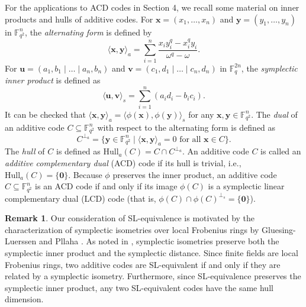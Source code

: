 \documentclass[a4paper,12pt]{article}
\theoremstyle{plain}
\theoremstyle{definition}
\newtheorem{remark}{Remark}
\begin{document}
For the applications to ACD codes in Section 4, we recall some material on inner products and hulls of additive codes. 
For $\mathbf{x} = (x_1, \dots, x_n)$ and $\mathbf{y} = (y_1, \dots, y_n)$ in $\mathbb{F}_{q^2}^n$, the \textit{alternating form} is defined by
\begin{equation*}
\langle \mathbf{x}, \mathbf{y} \rangle_a = \sum_{i=1}^n \frac{x_i y_i^q - x_i^q y_i}{\omega^q - \omega}.
\end{equation*}
For $\mathbf{u} = (a_1, b_1 \mid \dots \mid a_n, b_n)$ and $\mathbf{v} = (c_1, d_1 \mid \dots \mid c_n, d_n)$ in $\mathbb{F}_q^{2n}$, the \textit{symplectic inner product} is defined as
\begin{equation*}
\langle \mathbf{u}, \mathbf{v} \rangle_s = \sum_{i=1}^n (a_i d_i - b_i c_i).
\end{equation*}
It can be checked that $\langle \mathbf{x}, \mathbf{y} \rangle_a = \langle \phi(\mathbf{x}), \phi(\mathbf{y}) \rangle_s$ for any $\mathbf{x}, \mathbf{y} \in \mathbb{F}_{q^2}^n$. 
The \textit{dual} of an additive code $C \subseteq \mathbb{F}_{q^2}^n$ with respect to the alternating form is defined as
\begin{equation*}
C^{\perp_a} = \{ \mathbf{y} \in \mathbb{F}_{q^2}^n \mid \langle \mathbf{x}, \mathbf{y} \rangle_a = 0 \text{ for all } \mathbf{x} \in C \}.
\end{equation*}
The \textit{hull} of $C$ is defined as $\mathrm{Hull}_a(C) = C \cap C^{\perp_a}$. An additive code $C$ is called an \textit{additive complementary dual} (ACD) code if its hull is trivial, i.e., $\mathrm{Hull}_a(C) = \{\mathbf{0}\}$. Because $\phi$ preserves the inner product, an additive code $C \subseteq \mathbb{F}_{q^2}^n$ is an ACD code if and only if its image $\phi(C)$ is a symplectic linear complementary dual (LCD) code (that is, $\phi(C) \cap \phi(C)^{\perp_s} = \{\mathbf{0}\}$).

\begin{remark} \label{remarkSLhull}
Our consideration of \textrm{SL}-equivalence is motivated by the characterization of symplectic isometries over local Frobenius rings by Gluesing-Luerssen and Pllaha \cite[Theorem 7.1]{gluesing2019}. As noted in \cite[Section 7]{gluesing2019}, symplectic isometries preserve both the symplectic inner product and the symplectic distance. Since finite fields are local Frobenius rings, two additive codes are \textrm{SL}-equivalent if and only if they are related by a symplectic isometry.
Furthermore, since \textrm{SL}-equivalence   preserves the symplectic inner product, any two \textrm{SL}-equivalent codes have the same hull dimension.  
\end{remark}
 
\end{document}
